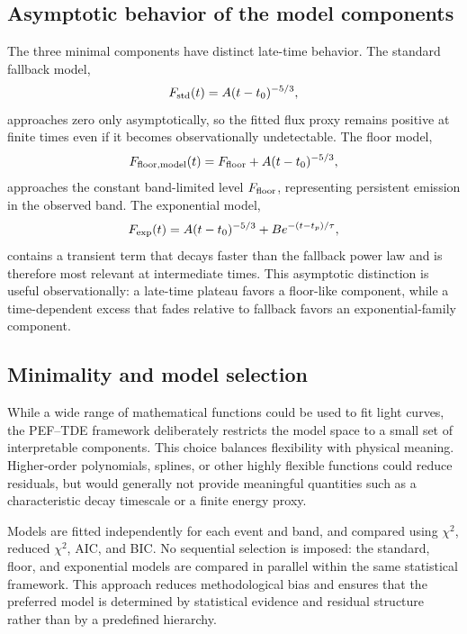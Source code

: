 \documentclass[11pt]{article}
\begin{document}
\subsection{Asymptotic behavior of the model components}
The three minimal components have distinct late-time behavior. The standard fallback model,
\begin{equation}
F_{\rm std}(t)=A(t-t_0)^{-5/3},
\end{equation}
approaches zero only asymptotically, so the fitted flux proxy remains positive at finite times even if it becomes observationally undetectable. The floor model,
\begin{equation}
F_{\rm floor,model}(t)=F_{\rm floor}+A(t-t_0)^{-5/3},
\end{equation}
approaches the constant band-limited level $F_{\rm floor}$, representing persistent emission in the observed band. The exponential model,
\begin{equation}
F_{\rm exp}(t)=A(t-t_0)^{-5/3}+B e^{-(t-t_p)/\tau},
\end{equation}
contains a transient term that decays faster than the fallback power law and is therefore most relevant at intermediate times. This asymptotic distinction is useful observationally: a late-time plateau favors a floor-like component, while a time-dependent excess that fades relative to fallback favors an exponential-family component.

\subsection{Minimality and model selection}
While a wide range of mathematical functions could be used to fit light curves, the PEF--TDE framework deliberately restricts the model space to a small set of interpretable components. This choice balances flexibility with physical meaning. Higher-order polynomials, splines, or other highly flexible functions could reduce residuals, but would generally not provide meaningful quantities such as a characteristic decay timescale or a finite energy proxy.

Models are fitted independently for each event and band, and compared using $\chi^2$, reduced $\chi^2$, AIC, and BIC. No sequential selection is imposed: the standard, floor, and exponential models are compared in parallel within the same statistical framework. This approach reduces methodological bias and ensures that the preferred model is determined by statistical evidence and residual structure rather than by a predefined hierarchy.
\end{document}
